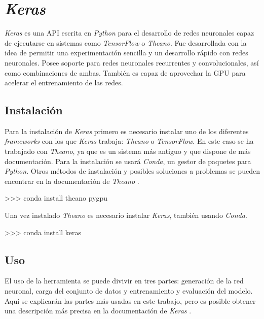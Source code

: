 
\chapter{\textit{Keras}} 
\label{ap:keras}

\textit{Keras} es una API escrita en \textit{Python} para el desarrollo de
redes neuronales capaz de ejecutarse en sistemas como \textit{TensorFlow} o
\textit{Theano}. Fue desarrollada con la idea de permitir una experimentación
sencilla y un desarrollo rápido con redes neuronales. Posee soporte para redes
neuronales recurrentes y convolucionales, así como combinaciones de ambas.
También es capaz de aprovechar la GPU para acelerar el entrenamiento de las
redes.


\section{Instalación} 

Para la instalación de \textit{Keras} primero es necesario instalar uno de los
diferentes \textit{frameworks} con los que \textit{Keras} trabaja: \textit{Theano} o
\textit{TensorFlow}. En este caso se ha trabajado con \textit{Theano}, ya que
es un sistema más antiguo y que dispone de más documentación. Para la
instalación se usará \textit{Conda}, un gestor de paquetes para
\textit{Python}. Otros métodos de instalación y posibles soluciones a problemas
se pueden encontrar en la documentación de \textit{Theano} \parencite{theano}.

\begin{python}
>>> conda install theano pygpu
\end{python}

Una vez instalado \textit{Theano} es necesario instalar \textit{Keras}, también
usando \textit{Conda}.

\begin{python}
>>> conda install keras
\end{python}


\section{Uso} 

El uso de la herramienta se puede divivir en tres partes: generación de la red
neuronal, carga del conjunto de datos y entrenamiento y evaluación del modelo.
Aquí se explicarán las partes más usadas en este trabajo, pero es posible
obtener una descripción más precisa en la documentación de \textit{Keras}
\parencite{keras_doc}.

